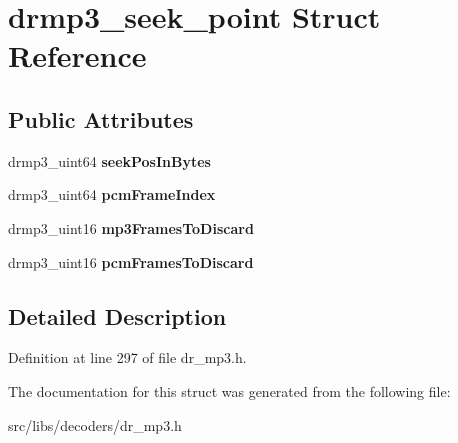 \hypertarget{structdrmp3__seek__point}{\section{drmp3\-\_\-seek\-\_\-point Struct Reference}
\label{structdrmp3__seek__point}
}
\subsection*{Public Attributes}
\begin{DoxyCompactItemize}
\item 
\hypertarget{structdrmp3__seek__point_a5398f0b18f7fe2641fb711811c113ee4}{drmp3\-\_\-uint64 {\bfseries seek\-Pos\-In\-Bytes}}\label{structdrmp3__seek__point_a5398f0b18f7fe2641fb711811c113ee4}

\item 
\hypertarget{structdrmp3__seek__point_a66ef89cbe38ffcc98e90ca129eaa610c}{drmp3\-\_\-uint64 {\bfseries pcm\-Frame\-Index}}\label{structdrmp3__seek__point_a66ef89cbe38ffcc98e90ca129eaa610c}

\item 
\hypertarget{structdrmp3__seek__point_aa34353c7d85e13d6a7e2eb5e96b1c831}{drmp3\-\_\-uint16 {\bfseries mp3\-Frames\-To\-Discard}}\label{structdrmp3__seek__point_aa34353c7d85e13d6a7e2eb5e96b1c831}

\item 
\hypertarget{structdrmp3__seek__point_ac4c6056504bcca1852715936035c1a31}{drmp3\-\_\-uint16 {\bfseries pcm\-Frames\-To\-Discard}}\label{structdrmp3__seek__point_ac4c6056504bcca1852715936035c1a31}

\end{DoxyCompactItemize}


\subsection{Detailed Description}


Definition at line 297 of file dr\-\_\-mp3.\-h.



The documentation for this struct was generated from the following file\-:\begin{DoxyCompactItemize}
\item 
src/libs/decoders/dr\-\_\-mp3.\-h\end{DoxyCompactItemize}
